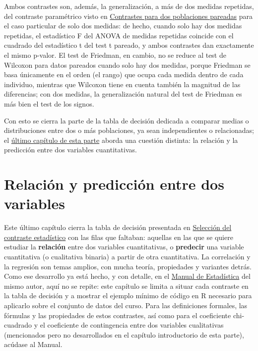 \documentclass[
  spanish,
  a4paper,
]{scrreport}
\theoremstyle{definition}
\theoremstyle{definition}
\theoremstyle{remark}
\begin{document}
Ambos contrastes son, además, la generalización, a más de dos medidas
repetidas, del contraste paramétrico visto en
\hyperref[contrastes-para-dos-poblaciones-pareadas]{Contrastes para dos
poblaciones pareadas} para el caso particular de solo dos medidas: de
hecho, cuando solo hay dos medidas repetidas, el estadístico F del ANOVA
de medidas repetidas coincide con el cuadrado del estadístico t del test
t pareado, y ambos contrastes dan exactamente el mismo p-valor. El test
de Friedman, en cambio, no se reduce al test de Wilcoxon para datos
pareados cuando solo hay dos medidas, porque Friedman se basa únicamente
en el orden (el rango) que ocupa cada medida dentro de cada individuo,
mientras que Wilcoxon tiene en cuenta también la magnitud de las
diferencias; con dos medidas, la generalización natural del test de
Friedman es más bien el test de los signos.

Con esto se cierra la parte de la tabla de decisión dedicada a comparar
medias o distribuciones entre dos o más poblaciones, ya sean
independientes o relacionadas; el
\href{16-relacion-entre-variables.qmd}{último capítulo de esta parte}
aborda una cuestión distinta: la relación y la predicción entre dos
variables cuantitativas.

\chapter{Relación y predicción entre dos
variables}\label{relaciuxf3n-y-predicciuxf3n-entre-dos-variables}

Este último capítulo cierra la tabla de decisión presentada en
\hyperref[selecciuxf3n-del-contraste-estaduxedstico-1]{Selección del
contraste estadístico} con las filas que faltaban: aquellas en las que
se quiere estudiar la \textbf{relación} entre dos variables
cuantitativas, o \textbf{predecir} una variable cuantitativa (o
cualitativa binaria) a partir de otra cuantitativa. La correlación y la
regresión son temas amplios, con mucha teoría, propiedades y variantes
detrás. Como ese desarrollo ya está hecho, y con detalle, en el
\href{https://aprendeconalf.es/estadistica-manual/}{Manual de
Estadística} del mismo autor, aquí no se repite: este capítulo se limita
a situar cada contraste en la tabla de decisión y a mostrar el ejemplo
mínimo de código en R necesario para aplicarlo sobre el conjunto de
datos del curso. Para las definiciones formales, las fórmulas y las
propiedades de estos contrastes, así como para el coeficiente
chi-cuadrado y el coeficiente de contingencia entre dos variables
cualitativas (mencionados pero no desarrollados en el capítulo
introductorio de esta parte), acúdase al Manual.
\end{document}

